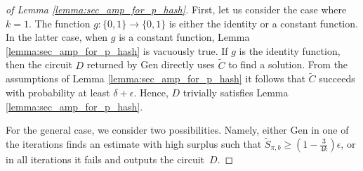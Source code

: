 %
%
\begin{proof}[of Lemma \ref{lemma:sec_amp_for_p_hash}]
First, let us consider the case where $k=1$. The function $g: \{0,1\} \rightarrow \{0,1\}$ is either the identity or a constant function.
In the latter case, when $g$ is a constant function, Lemma \ref{lemma:sec_amp_for_p_hash} is vacuously true.
If $g$ is the identity function, then the circuit $D$ returned by Gen directly uses $\widetilde{C}$ to find a solution.
From the assumptions of Lemma \ref{lemma:sec_amp_for_p_hash} it follows that $\widetilde{C}$ succeeds with probability at least
$\delta + \epsilon$. Hence, $D$ trivially satisfies Lemma \ref{lemma:sec_amp_for_p_hash}.

For the general case, we consider two possibilities.
Namely, either Gen in one of the iterations finds an estimate with high surplus such that $\widetilde{S}_{\pi, b} \geq (1-\frac{3}{4k})\epsilon$,
or in all iterations it fails and outputs the circuit~$D$.


\end{proof}
